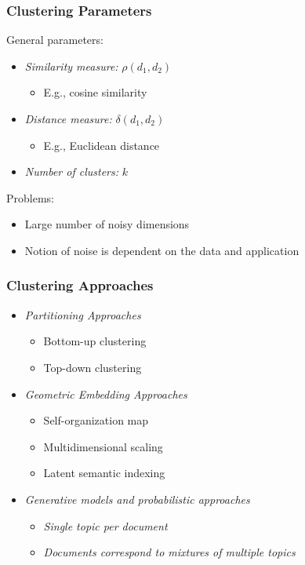 \documentclass{beamer}
\begin{document}

\begin{frame}
  \frametitle{Clustering Parameters}

  General parameters:
  \begin{itemize}
  \item \emph{Similarity measure:} $\rho(d_1,d_2)$
    \begin{itemize}
    \item E.g., cosine similarity
    \end{itemize}
  \item \emph{Distance measure:} $\delta(d_1,d_2)$
    \begin{itemize}
    \item E.g., Euclidean distance
    \end{itemize}
  \item \emph{Number of clusters:} $k$
  \end{itemize}

  Problems:
  \begin{itemize}
  \item Large number of noisy dimensions
  \item Notion of noise is dependent on the data and application 
  \end{itemize}

\end{frame}


\begin{frame}
  \frametitle{Clustering Approaches}

  \begin{itemize}
  \item \emph{Partitioning Approaches}
    \begin{itemize}
    \item Bottom-up clustering
    \item Top-down clustering
    \end{itemize}
  \item \emph{Geometric Embedding Approaches}
    \begin{itemize}
    \item Self-organization map
    \item Multidimensional scaling
    \item Latent semantic indexing
    \end{itemize}
  \item \emph{\it Generative models and probabilistic approaches}
    \begin{itemize}
    \item {\it Single topic per document}
    \item {\it Documents correspond to mixtures of multiple topics}
    \end{itemize}
  \end{itemize}

\end{frame}
\end{document}
